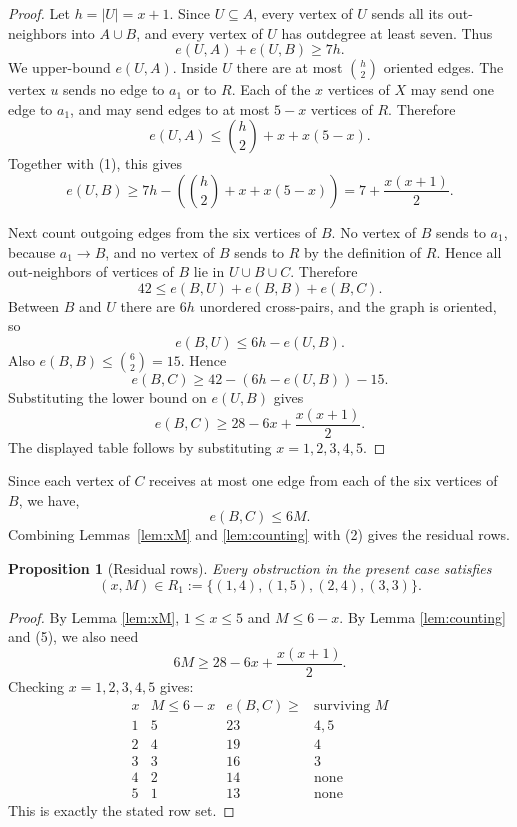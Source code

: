 \documentclass[a4paper,fleqn]{cas-sc}
\newtheorem{proposition}[theorem]{Proposition}
\theoremstyle{definition}
\begin{document}
\begin{proof}
Let $h=|U|=x+1$. Since $U\subseteq A$, every vertex of $U$ sends all its out-neighbors into $A\cup B$, and every vertex of $U$ has outdegree at least seven. Thus
\begin{equation}
e(U,A)+e(U,B)\ge 7h.\tag{1}
\end{equation}
We upper-bound $e(U,A)$. Inside $U$ there are at most $\binom h2$ oriented edges. The vertex $u$ sends no edge to $a_1$ or to $R$. Each of the $x$ vertices of $X$ may send one edge to $a_1$, and may send edges to at most $5-x$ vertices of $R$. Therefore
\[
e(U,A)\le \binom h2+x+x(5-x).
\]
Together with (1), this gives
\[
e(U,B)\ge 7h-\left(\binom h2+x+x(5-x)\right)
=7+\frac{x(x+1)}2.
\]

Next count outgoing edges from the six vertices of $B$. No vertex of $B$ sends to $a_1$, because $a_1\to B$, and no vertex of $B$ sends to $R$ by the definition of $R$. Hence all out-neighbors of vertices of $B$ lie in $U\cup B\cup C$. Therefore
\[
42\le e(B,U)+e(B,B)+e(B,C).
\]
Between $B$ and $U$ there are $6h$ unordered cross-pairs, and the graph is oriented, so
\[
e(B,U)\le 6h-e(U,B).
\]
Also $e(B,B)\le \binom 62=15$. Hence
\[
e(B,C)\ge 42-(6h-e(U,B))-15.
\]
Substituting the lower bound on $e(U,B)$ gives
\[
e(B,C)\ge 28-6x+\frac{x(x+1)}2.
\]
The displayed table follows by substituting $x=1,2,3,4,5$.
\end{proof}

Since each vertex of $C$ receives at most one edge from each of the six vertices of $B$, we have,
\begin{equation}
e(B,C)\le 6M.\tag{2}
\end{equation}
Combining Lemmas~\ref{lem:xM} and \ref{lem:counting} with (2) gives the residual rows.

\begin{proposition}[Residual rows]\label{prop:rows}
Every obstruction in the present case satisfies
\[
(x,M)\in R_1:=\{(1,4),(1,5),(2,4),(3,3)\}.
\]
\end{proposition}

\begin{proof}
By Lemma \ref{lem:xM}, $1\le x\le 5$ and $M\le 6-x$. By Lemma \ref{lem:counting} and (5), we also need
\[
6M\ge 28-6x+\frac{x(x+1)}2.
\]
Checking $x=1,2,3,4,5$ gives:
\[
\begin{array}{c|c|c|c}
x&M\le 6-x&e(B,C)\ge&\text{surviving }M\\ \hline
1&5&23&4,5\\
2&4&19&4\\
3&3&16&3\\
4&2&14&\text{none}\\
5&1&13&\text{none}
\end{array}
\]
This is exactly the stated row set.
\end{proof}
\end{document}
